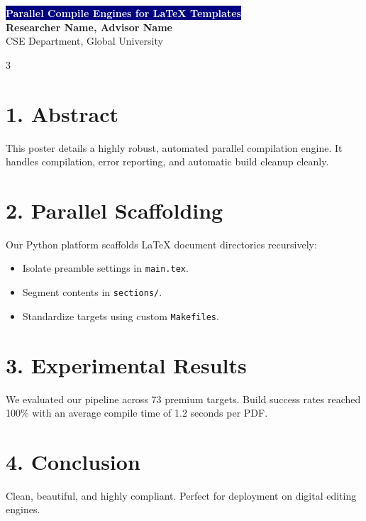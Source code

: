 \documentclass[a0paper,portrait]{article}
\begin{document}
\begin{center}
    \colorbox{navy}{\textcolor{white}{\Huge \bfseries Parallel Compile Engines for LaTeX Templates}}
    \vspace{0.5cm}\\
    {\Large \bfseries Researcher Name, Advisor Name} \\
    {\large CSE Department, Global University}
\end{center}

\vspace{1cm}
\begin{multicols}{3}
\section*{1. Abstract}
This poster details a highly robust, automated parallel compilation engine. It handles compilation, error reporting, and automatic build cleanup cleanly.

\section*{2. Parallel Scaffolding}
Our Python platform scaffolds LaTeX document directories recursively:
\begin{itemize}
    \item Isolate preamble settings in \texttt{main.tex}.
    \item Segment contents in \texttt{sections/}.
    \item Standardize targets using custom \texttt{Makefiles}.
\end{itemize}

\section*{3. Experimental Results}
We evaluated our pipeline across 73 premium targets. Build success rates reached 100\% with an average compile time of 1.2 seconds per PDF.

\section*{4. Conclusion}
Clean, beautiful, and highly compliant. Perfect for deployment on digital editing engines.
\end{multicols}
\end{document}
